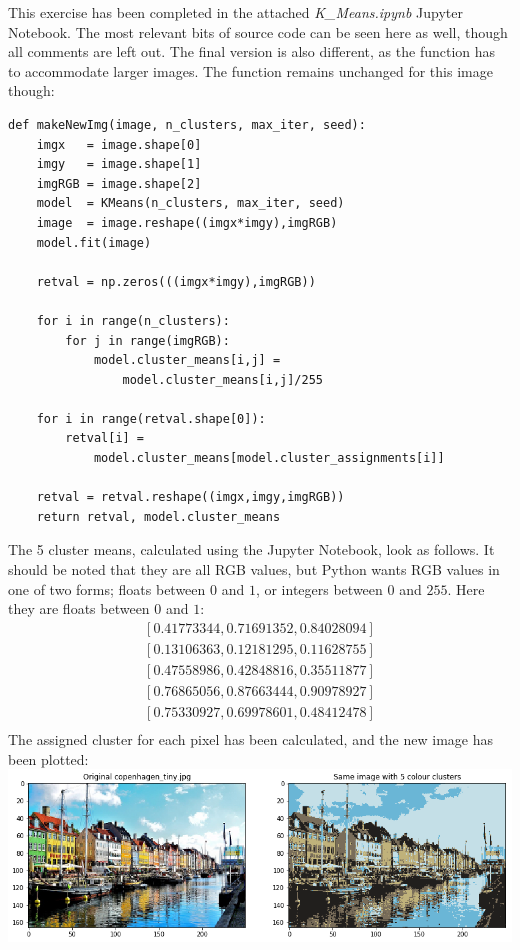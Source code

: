 This exercise has been completed in the attached \textit{K\_Means.ipynb} Jupyter Notebook. The most relevant bits of source code can be seen here as well, though all comments are left out. The final version is also different, as the function has to accommodate larger images. The function remains unchanged for this image though:
\begin{verbatim}
def makeNewImg(image, n_clusters, max_iter, seed):
    imgx   = image.shape[0]
    imgy   = image.shape[1]
    imgRGB = image.shape[2]
    model  = KMeans(n_clusters, max_iter, seed)
    image  = image.reshape((imgx*imgy),imgRGB)
    model.fit(image)
    
    retval = np.zeros(((imgx*imgy),imgRGB))

    for i in range(n_clusters):
        for j in range(imgRGB):
            model.cluster_means[i,j] = 
                model.cluster_means[i,j]/255
            
    for i in range(retval.shape[0]):
        retval[i] = 
            model.cluster_means[model.cluster_assignments[i]]
        
    retval = retval.reshape((imgx,imgy,imgRGB))
    return retval, model.cluster_means
\end{verbatim}
The 5 cluster means, calculated using the Jupyter Notebook, look as follows. It should be noted that they are all RGB values, but Python wants RGB values in one of two forms; floats between $0$ and $1$, or integers between $0$ and $255$. Here they are floats between $0$ and $1$:
$$
\begin{matrix}
[0.41773344, 0.71691352, 0.84028094] \\[3pt]
[0.13106363, 0.12181295, 0.11628755] \\[3pt]
[0.47558986, 0.42848816, 0.35511877] \\[3pt]
[0.76865056, 0.87663444, 0.90978927] \\[3pt]
[0.75330927, 0.69978601, 0.48412478] \\[3pt]
\end{matrix}
$$
The assigned cluster for each pixel has been calculated, and the new image has been plotted:\\
\includegraphics[width=\linewidth]{3b1.png}\\
